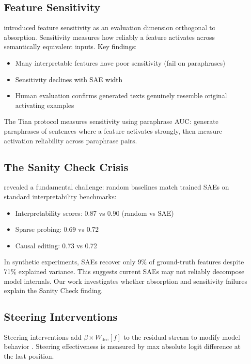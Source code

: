 \documentclass{article}
\begin{document}
\subsection{Feature Sensitivity}

\citet{tian2025feature} introduced feature sensitivity as an evaluation dimension orthogonal to absorption. Sensitivity measures how reliably a feature activates across semantically equivalent inputs. Key findings:
\begin{itemize}
  \item Many interpretable features have poor sensitivity (fail on paraphrases)
  \item Sensitivity declines with SAE width
  \item Human evaluation confirms generated texts genuinely resemble original activating examples
\end{itemize}

The Tian protocol measures sensitivity using paraphrase AUC: generate paraphrases of sentences where a feature activates strongly, then measure activation reliability across paraphrase pairs.

\subsection{The Sanity Check Crisis}

\citet{korznikov2026sanity} revealed a fundamental challenge: random baselines match trained SAEs on standard interpretability benchmarks:
\begin{itemize}
  \item Interpretability scores: 0.87 vs 0.90 (random vs SAE)
  \item Sparse probing: 0.69 vs 0.72
  \item Causal editing: 0.73 vs 0.72
\end{itemize}

In synthetic experiments, SAEs recover only 9\% of ground-truth features despite 71\% explained variance. This suggests current SAEs may not reliably decompose model internals. Our work investigates whether absorption and sensitivity failures explain the Sanity Check finding.

\subsection{Steering Interventions}

Steering interventions add $\beta \times W_{\text{dec}}[f]$ to the residual stream to modify model behavior \citep{subramani2022steering, zou2023concept}. Steering effectiveness is measured by max absolute logit difference at the last position.
\end{document}
